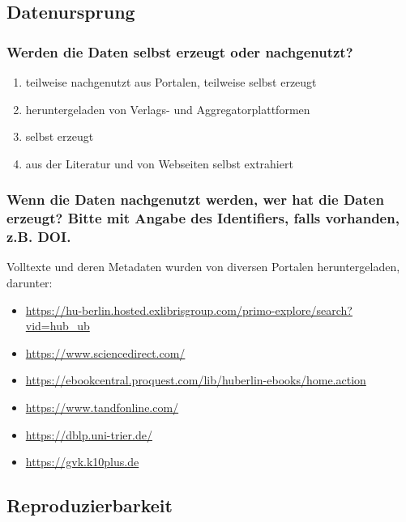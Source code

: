 \documentclass[%
  11pt,
  DIV=16,
  a4paper,
  BCOR=15mm,
  twoside=on,
  bibliography=totoc,
  headings=normal,
  numbers=noendperiod,
]{scrartcl}
\begin{document}
\subsection{Datenursprung}

\subsubsection{Werden die Daten selbst erzeugt oder nachgenutzt?}

\begin{enumerate}[(1)]
  \item
    teilweise nachgenutzt aus Portalen, teilweise selbst erzeugt
  \item
    heruntergeladen von Verlags- und Aggregatorplattformen
  \item
    selbst erzeugt
  \item
    aus der Literatur und von Webseiten selbst extrahiert
\end{enumerate}

\subsubsection{Wenn die Daten nachgenutzt werden, wer hat die Daten erzeugt? Bitte mit Angabe des Identifiers, falls vorhanden, z.B. DOI.}

Volltexte und deren Metadaten wurden von diversen Portalen heruntergeladen, darunter:
%
\begin{itemize}
  \item
    \url{https://hu-berlin.hosted.exlibrisgroup.com/primo-explore/search?vid=hub_ub}
  \item
    \url{https://www.sciencedirect.com/}
  \item
    \url{https://ebookcentral.proquest.com/lib/huberlin-ebooks/home.action}
  \item
    \url{https://www.tandfonline.com/}
  \item
    \url{https://dblp.uni-trier.de/}
  \item
    \url{https://gvk.k10plus.de}
\end{itemize}

\subsection{Reproduzierbarkeit}
\end{document}
